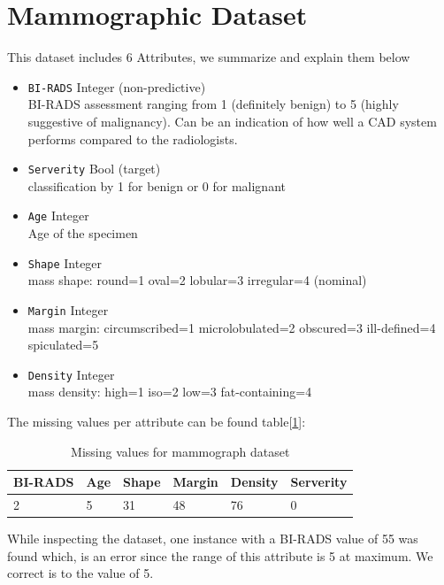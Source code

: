 \documentclass[11pt]{article}
\begin{document}
\section{Mammographic Dataset}
This dataset includes 6 Attributes, we summarize and explain them below

\begin{multicols}{2}
\begin{itemize}
\item \texttt{BI-RADS} Integer (non-predictive)\\
 BI-RADS assessment ranging from 1 (definitely benign)
to 5 (highly suggestive of malignancy). Can be an indication of how well a CAD system performs compared to the radiologists.
\columnbreak
\item \texttt{Serverity} Bool (target) \\
classification by 1 for benign or 0 for malignant
\item \texttt{Age} Integer  \\
Age of the specimen
\end{itemize}
\begin{itemize}
\item \texttt{Shape} Integer  \\
mass shape: round=1 oval=2 lobular=3 irregular=4 (nominal) 
\item \texttt{Margin} Integer  \\
mass margin: circumscribed=1 microlobulated=2 obscured=3 ill-defined=4 spiculated=5 
\item \texttt{Density} Integer  \\
mass density: high=1 iso=2 low=3 fat-containing=4
\end{itemize}
\end{multicols}

The missing values per attribute can be found table[\ref{tab:mamm1}]:

\begin{table}[H]
\begin{tabularx}{1.0\linewidth}{XXXXXX}
\hline
BI-RADS & Age &Shape &Margin & Density & Serverity  \\
\hline
2 & 5 & 31 & 48 & 76 & 0
\end{tabularx}
\label{tab:mamm1}
\caption{Missing values for mammograph dataset}
\end{table}

While inspecting the dataset, one instance with a BI-RADS value of 55 was found which, is an error since the range of this attribute is 5 at maximum. We correct is to the value of 5. 
\end{document}
